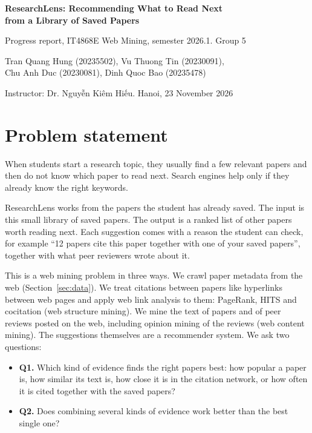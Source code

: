 \documentclass[11pt,a4paper]{article}
\begin{document}
\begin{center}
{\Large\bfseries ResearchLens: Recommending What to Read Next\\from a Library of Saved Papers}\par\medskip
Progress report, IT4868E Web Mining, semester 2026.1. Group 5\par
Tran Quang Hung (20235502), Vu Thuong Tin (20230091),\\ Chu Anh Duc (20230081), Dinh Quoc Bao (20235478)\par
Instructor: Dr. Nguyễn Kiêm Hiếu. Hanoi, 23 November 2026
\end{center}

\section{Problem statement}
When students start a research topic, they usually find a few relevant papers and then do not know which paper to read next. Search engines help only if they already know the right keywords.

ResearchLens works from the papers the student has already saved. The input is this small library of saved papers. The output is a ranked list of other papers worth reading next. Each suggestion comes with a reason the student can check, for example ``12 papers cite this paper together with one of your saved papers'', together with what peer reviewers wrote about it.

This is a web mining problem in three ways. We crawl paper metadata from the web (Section~\ref{sec:data}). We treat citations between papers like hyperlinks between web pages and apply web link analysis to them: PageRank, HITS and cocitation (web structure mining). We mine the text of papers and of peer reviews posted on the web, including opinion mining of the reviews (web content mining). The suggestions themselves are a recommender system. We ask two questions:
\begin{itemize}
\item \textbf{Q1.} Which kind of evidence finds the right papers best: how popular a paper is, how similar its text is, how close it is in the citation network, or how often it is cited together with the saved papers?
\item \textbf{Q2.} Does combining several kinds of evidence work better than the best single one?
\end{itemize}
\end{document}
